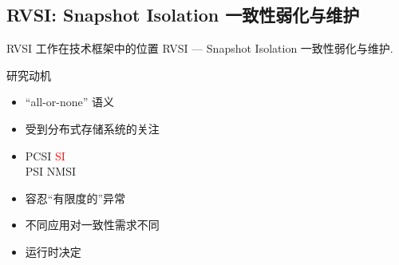 \subsection{RVSI: Snapshot Isolation 一致性弱化与维护}

\newcommand{\chameleon}{\textsc{Chameleon}}
\begin{frame}{RVSI 工作在技术框架中的位置}
	{RVSI --- Snapshot Isolation 一致性弱化与维护.}
\end{frame}
\begin{frame}{研究动机}
  \vspace{0.20cm}

  \begin{description}
    \setlength{\itemsep}{5pt}
    \item[分布式事务:] 
      \begin{itemize}
        \item ``all-or-none'' 语义
        \item 受到分布式存储系统的关注 
      \end{itemize}
    \item[弱一致性:] 
      \begin{itemize}
        \item PCSI  
		  \textcolor{red}{SI}  \\
          PSI  NMSI  
        \end{itemize}
    \pause
	\item[\textcolor{red}{异常控制:}]
      \begin{itemize}
        \item 容忍``有限度的''异常 
      \end{itemize}
	\item[\textcolor{red}{可定制:}] 
      \begin{itemize}
        \item 不同应用对一致性需求不同 
        \item 运行时决定 
      \end{itemize}
  \end{description}
 
\end{frame}
